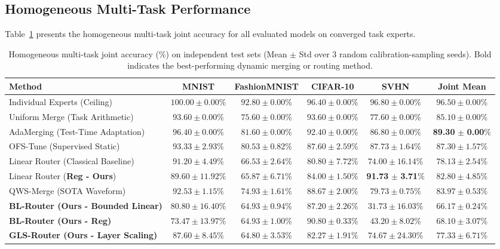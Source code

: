 \subsection{Homogeneous Multi-Task Performance}
Table~\ref{tab:homogeneous_results} presents the homogeneous multi-task joint accuracy for all evaluated models on converged task experts.

\begin{table}[t]
\centering
\caption{Homogeneous multi-task joint accuracy (\%) on independent test sets (Mean $\pm$ Std over 3 random calibration-sampling seeds). Bold indicates the best-performing dynamic merging or routing method.}
\label{tab:homogeneous_results}
\vskip 0.15in
\begin{tabular}{lccccc}
\toprule
Method & MNIST & FashionMNIST & CIFAR-10 & SVHN & Joint Mean \\
\midrule
Individual Experts (Ceiling) & $100.00 \pm 0.00$\% & $92.80 \pm 0.00$\% & $96.40 \pm 0.00$\% & $96.80 \pm 0.00$\% & $96.50 \pm 0.00$\% \\
\midrule
Uniform Merge (Task Arithmetic) & $93.60 \pm 0.00$\% & $75.60 \pm 0.00$\% & $93.60 \pm 0.00$\% & $77.60 \pm 0.00$\% & $85.10 \pm 0.00$\% \\
AdaMerging (Test-Time Adaptation) & $96.40 \pm 0.00$\% & $81.60 \pm 0.00$\% & $92.40 \pm 0.00$\% & $86.80 \pm 0.00$\% & \textbf{89.30} $\pm$ \textbf{0.00}\% \\
OFS-Tune (Supervised Static) & $93.33 \pm 2.93$\% & $80.53 \pm 0.82$\% & $87.60 \pm 2.59$\% & $87.73 \pm 1.64$\% & $87.30 \pm 1.57$\% \\
\midrule
Linear Router (Classical Baseline) & $91.20 \pm 4.49$\% & $66.53 \pm 2.64$\% & $80.80 \pm 7.72$\% & $74.00 \pm 16.14$\% & $78.13 \pm 2.54$\% \\
Linear Router (\textbf{Reg - Ours}) & $89.60 \pm 11.92$\% & $65.87 \pm 6.71$\% & $84.00 \pm 1.50$\% & \textbf{91.73} $\pm$ \textbf{3.71}\% & $82.80 \pm 4.85$\% \\
QWS-Merge (SOTA Waveform) & $92.53 \pm 1.15$\% & $74.93 \pm 1.61$\% & $88.67 \pm 2.00$\% & $79.73 \pm 0.75$\% & $83.97 \pm 0.53$\% \\
\midrule
\textbf{BL-Router (Ours - Bounded Linear)} & $80.80 \pm 16.40$\% & $64.93 \pm 0.94$\% & $87.20 \pm 2.26$\% & $31.73 \pm 16.03$\% & $66.17 \pm 0.24$\% \\
\textbf{BL-Router (Ours - Reg)} & $73.47 \pm 13.97$\% & $64.93 \pm 1.00$\% & $90.80 \pm 0.33$\% & $43.20 \pm 8.02$\% & $68.10 \pm 3.07$\% \\
\textbf{GLS-Router (Ours - Layer Scaling)} & $87.60 \pm 8.45$\% & $64.80 \pm 3.53$\% & $82.27 \pm 1.91$\% & $74.67 \pm 24.30$\% & $77.33 \pm 6.71$\% \\

\end{tabular}
\end{table}
